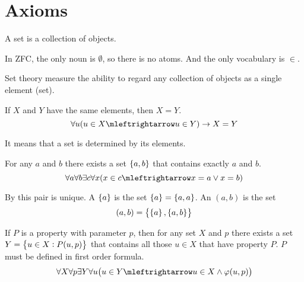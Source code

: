 \section{Axioms}

\begin{definition}
    A set is a collection of objects.
\end{definition}

In ZFC, the only noun is $\emptyset$, so there is no atoms. And the only vocabulary is $\in$.

Set theory measure the ability to regard any collection of objects as a single element (set).

\begin{axiom}\label{axiomofextensionality}
    If $X$ and $Y$ have the same elements, then $X=Y$.
    \begin{equation}
        \forall u (u \in X \mleftrightarrow u \in Y ) \rightarrow X = Y
    \end{equation}
\end{axiom}

It means that a set is determined by its elements.

\begin{axiom}
    For any $a$ and $b$ there exists a set $\set{a,b}$ that contains exactly $a$ and $b$.
    \begin{equation}
        \forall a \forall b \exists c \forall x (x \in c \mleftrightarrow x = a \vee x = b )
    \end{equation}
\end{axiom}

By  this pair is unique. A  $\set{a}$ is the set $\set{a} = \set{a, a}$. An  $(a,b)$ is the set 
    \begin{equation}
        (a,b) = \set{\set{a}, \set{a,b}}
    \end{equation}



\begin{axiom}
    If $P$ is a property with parameter $p$, then for any set $X$ and $p$ there exists a set $Y = \set{u \in X: P(u,p)}$ that contains all those $u \in X$ that have property $P$. $P$ must be defined in first order formula.
    \begin{equation}
        \forall X \forall p \exists Y \forall u \mleft(u \in Y \mleftrightarrow u \in X \wedge \varphi(u, p) \mright)
    \end{equation}    
\end{axiom}

